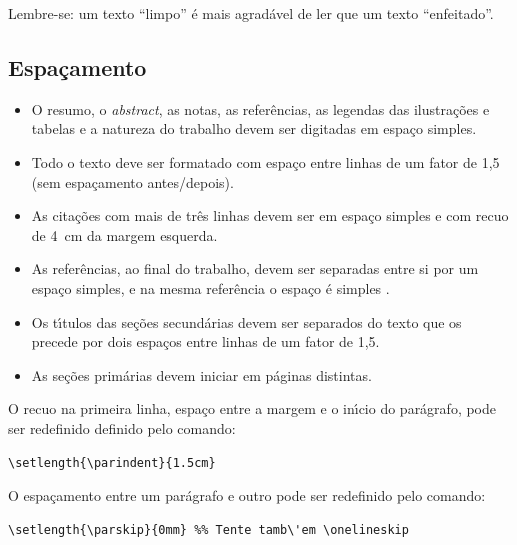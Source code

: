 \noindent Lembre-se: um texto ``limpo'' \'e mais agrad\'avel de ler que um texto ``enfeitado''.

\subsection{Espa\c{c}amento}\label{sec:espacamento}

\begin{itemize}%
\item O resumo, o \textit{abstract}, as notas, as refer\^encias, as legendas das ilustra\c{c}\~oes e tabelas e a natureza do trabalho devem ser digitadas em espa\c{c}o simples.
\item Todo o texto deve ser formatado com espa\c{c}o entre linhas de um fator de 1,5 (sem espa\c{c}amento antes/depois).
\item As cita\c{c}\~oes com mais de tr\^es linhas devem ser em espa\c{c}o simples e com recuo de \SI{4}{cm} da margem esquerda.
\item As refer\^encias, ao final do trabalho, devem ser separadas entre si por um espa\c{c}o simples, e na mesma refer\^encia o espa\c{c}o \'e simples \cite{NBR6023:2018}.
\item Os t\'{\i}tulos das se\c{c}\~oes secund\'arias devem ser separados do texto que os precede por dois espa\c{c}os entre linhas de um fator de 1,5.
\item As se\c{c}\~oes prim\'arias devem iniciar em p\'aginas distintas.
\end{itemize}

O recuo na primeira linha, espa\c{c}o entre a margem e o in\'{\i}cio do par\'agrafo, pode ser redefinido definido pelo comando:

\begin{SingleSpacing}%
\begin{verbatim}
\setlength{\parindent}{1.5cm}
\end{verbatim}
\end{SingleSpacing}

O espa\c{c}amento entre um par\'agrafo e outro pode ser redefinido pelo comando:

\begin{SingleSpacing}%
\begin{verbatim}
\setlength{\parskip}{0mm} %% Tente tamb\'em \onelineskip
\end{verbatim}
\end{SingleSpacing}

